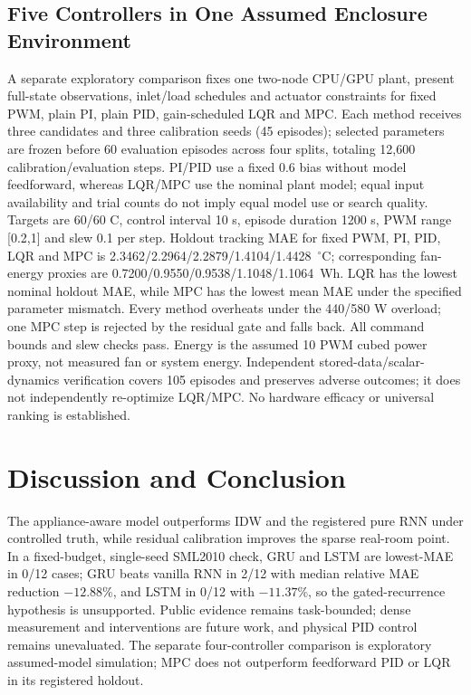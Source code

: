 \documentclass[conference,a4paper]{IEEEtran}
\begin{document}
\subsection{Five Controllers in One Assumed Enclosure Environment}
A separate exploratory comparison fixes one two-node CPU/GPU plant, present full-state observations, inlet/load schedules and actuator constraints for fixed PWM, plain PI, plain PID, gain-scheduled LQR and MPC. Each method receives three candidates and three calibration seeds (45 episodes); selected parameters are frozen before 60 evaluation episodes across four splits, totaling 12,600 calibration/evaluation steps. PI/PID use a fixed 0.6 bias without model feedforward, whereas LQR/MPC use the nominal plant model; equal input availability and trial counts do not imply equal model use or search quality. Targets are 60/60 C, control interval 10 s, episode duration 1200 s, PWM range [0.2,1] and slew 0.1 per step. Holdout tracking MAE for fixed PWM, PI, PID, LQR and MPC is 2.3462/\allowbreak{}2.2964/\allowbreak{}2.2879/\allowbreak{}1.4104/\allowbreak{}1.4428~$^\circ$C; corresponding fan-energy proxies are 0.7200/\allowbreak{}0.9550/\allowbreak{}0.9538/\allowbreak{}1.1048/\allowbreak{}1.1064~Wh. LQR has the lowest nominal holdout MAE, while MPC has the lowest mean MAE under the specified parameter mismatch. Every method overheats under the 440/580 W overload; one MPC step is rejected by the residual gate and falls back. All command bounds and slew checks pass. Energy is the assumed 10 PWM cubed power proxy, not measured fan or system energy. Independent stored-data/scalar-dynamics verification covers 105 episodes and preserves adverse outcomes; it does not independently re-optimize LQR/MPC. No hardware efficacy or universal ranking is established.


\section{Discussion and Conclusion}
The appliance-aware model outperforms IDW and the registered pure RNN under controlled truth, while residual calibration improves the sparse real-room point. In a fixed-budget, single-seed SML2010 check, GRU and LSTM are lowest-MAE in 0/12 cases; GRU beats vanilla RNN in 2/12 with median relative MAE reduction $-12.88\%$, and LSTM in 0/12 with $-11.37\%$, so the gated-recurrence hypothesis is unsupported. Public evidence remains task-bounded; dense measurement and interventions are future work, and physical PID control remains unevaluated. The separate four-controller comparison is exploratory assumed-model simulation; MPC does not outperform feedforward PID or LQR in its registered holdout.



\end{document}
